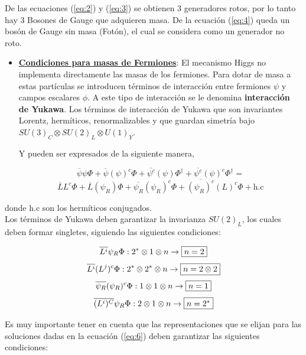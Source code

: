 \documentclass[12pt]{article}
\begin{document}
\begin{enumerate}
De las ecuaciones (\ref{eq:2}) y (\ref{eq:3}) se obtienen 3 generadores rotos, por lo tanto hay 3 Bosones de Gauge que adquieren masa. De la ecuación (\ref{eq:4}) queda un bosón de Gauge sin masa (Fotón), el cual se considera como un generador no roto. \\ 


\begin{itemize}
\item \underline{ \textbf{Condiciones para masas de Fermiones}}: El mecanismo Higgs no implementa directamente las masas de los fermiones. Para dotar de masa a estas partículas se introducen términos de interacción entre fermiones \(\psi\) y campos escalares \(\phi\). A este tipo de
interacción se le denomina \textbf{interacción de Yukawa}. Los términos de
interacción de Yukawa que son invariantes Lorentz, hermíticos, renormalizables y que guardan simetría bajo \(SU(3)_C \otimes SU(2)_L \otimes U(1)_Y \).

Y pueden ser expresados de la siguiente manera, 

\[\overline{\psi}\psi\Phi + \overline{\psi}(\psi)^{c}\Phi +  \overline{\psi^c}(\psi)\Phi^{\dagger} + \overline{\psi^c}(\psi)^c\Phi^{\dagger} = \]
\begin{equation}
    \overline{L}L^{c}\Phi +\overline{L}(\psi_R)\Phi  +  \overline{\psi_R}(\psi_R)^c\Phi + \overline{(\psi_R)^c}(L)^c\Phi + \text{h.c}  
    \label{eq:5}
\end{equation}
\end{itemize}

donde h.c son los hermíticos conjugados. \\

Los términos de Yukawa deben garantizar la invarianza \(SU(2)_L\), los cuales deben formar singletes, siguiendo las siguientes condiciones:

\[\overline{L^i}\psi_R\Phi : 2^*\otimes1 \otimes n \rightarrow \fbox{$n=2$}
 \]
\begin{equation}
\label{eq:21}
    \overline{L^i}(L^j)^c\Phi : 2^* \otimes 2^*\otimes n \rightarrow \fbox{$n=2\otimes 2$} \end{equation}
\[\overline{\psi_R}(\psi_R)^c\Phi : 1\otimes 1\otimes n \rightarrow \fbox{$n=1 $}\]
\begin{equation}
\overline{(L^i)^C}\psi_R\Phi : 2\otimes1 \otimes n \rightarrow \fbox{$n= 2^*$}
\label{eq:6}
\end{equation}

Es muy importante tener en cuenta que las representaciones que se elijan para las soluciones dadas en la ecuación (\ref{eq:6}) deben garantizar las siguientes condiciones:


\end{enumerate}
\end{document}
